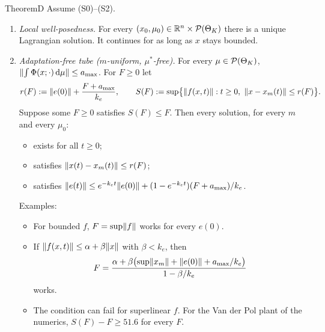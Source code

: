 \begin{thm}{Theorem}{D}
Assume \textup{(S0)--(S2)}.
\begin{enumerate}[label=\textup{(\alph*)}]
\item \emph{Local well-posedness.} For every $(x_0,\mu_0)\in\mathbb{R}^n\times\mathcal{P}(\Theta_K)$ there is a unique Lagrangian
  solution. It continues for as long as $x$ stays bounded.

\item \emph{Adaptation-free tube ($m$-uniform, $\mu^*$-free).} For every $\mu\in\mathcal{P}(\Theta_K)$,
  $\lVert \int\Phi(x;\cdot)\,\mathrm{d}\mu\rVert\le a_{\max}$. For $F\ge0$ let
  \[
    r(F) := \lVert e(0)\rVert + \frac{F+a_{\max}}{k_e},\qquad
    S(F) := \sup\bigl\{\lVert f(x,t)\rVert : t\ge0,\ \lVert x-x_m(t)\rVert\le r(F)\bigr\}.
  \]
  Suppose some $F\ge0$ satisfies $S(F)\le F$. Then every solution, for every $m$ and every $\mu_0$:
  \begin{itemize}
  \item exists for all $t\ge0$;
  \item satisfies $\lVert x(t)-x_m(t)\rVert\le r(F)$;
  \item satisfies $\lVert e(t)\rVert\le e^{-k_e t}\lVert e(0)\rVert + (1-e^{-k_e t})(F+a_{\max})/k_e$.
  \end{itemize}
  Examples:
  \begin{itemize}
  \item For bounded $f$, $F=\sup\lVert f\rVert$ works for every $e(0)$.
  \item If $\lVert f(x,t)\rVert\le\alpha+\beta\lVert x\rVert$ with $\beta<k_e$, then
    \[
      F = \frac{\alpha+\beta\bigl(\sup\lVert x_m\rVert+\lVert e(0)\rVert+a_{\max}/k_e\bigr)}{1-\beta/k_e}
    \]
    works.
  \item The condition can fail for superlinear $f$. For the Van der Pol plant of the numerics, $S(F)-F\ge51.6$ for
    every $F$.
  \end{itemize}


\end{enumerate}
\end{thm}
